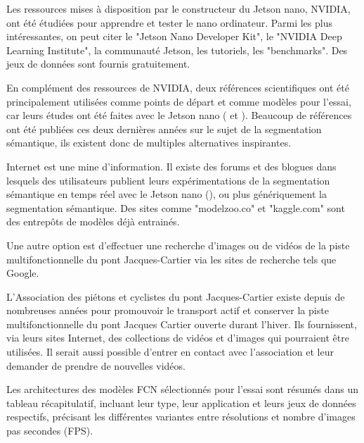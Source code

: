 ﻿\par Les ressources mises à disposition par le constructeur du Jetson nano, NVIDIA, ont été étudiées pour apprendre et tester le nano ordinateur. Parmi les plus intéressantes, on peut citer le "Jetson Nano Developer Kit", le "NVIDIA Deep Learning Institute", la communauté Jetson, les tutoriels, les "benchmarks". Des jeux de données sont fournis gratuitement.
\par En complément des ressources de NVIDIA, deux références scientifiques ont été principalement utilisées comme points de départ et comme modèles pour l'essai, car leurs études ont été faites avec le Jetson nano (\cite{nguyen_mavnet_2019} et \cite{chong_real-time_1992}). Beaucoup de références ont été publiées ces deux dernières années sur le sujet de la segmentation sémantique, ils existent donc de multiples alternatives inspirantes.
\par Internet est une mine d'information. Il existe des forums et des blogues dans lesquels des utilisateurs publient leurs expérimentations de la segmentation sémantique en temps réel avec le Jetson nano (\cite{dustin_realtime_2019}), ou plus génériquement la segmentation sémantique. Des sites comme "modelzoo.co" et "kaggle.com" sont des entrepôts de modèles déjà entrainés. 
\par Une autre option est d'effectuer une recherche d'images ou de vidéos de la piste multifonctionnelle du pont Jacques-Cartier via les sites de recherche tels que Google. 
\par L'Association des piétons et cyclistes du pont Jacques-Cartier existe depuis de nombreuses années pour promouvoir le transport actif et conserver la piste multifonctionnelle du pont Jacques Cartier ouverte durant l'hiver. Ils fournissent, via leurs sites Internet, des collections de vidéos et d'images qui pourraient être utilisées. Il serait aussi possible d'entrer en contact avec l'association et leur demander de prendre de nouvelles vidéos. \cite{association_des_pietons_et_cyclistes_du_pont_jacques-cartier_pontjacques-cartier365com_2020} \cite{association_des_pietons_et_cyclistes_pont_jacques-cartier_flickr_2020}
\par Les architectures des modèles FCN sélectionnés pour l'essai sont résumés dans un tableau récapitulatif, incluant leur type, leur application et leurs jeux de données respectifs, précisant les différentes variantes entre résolutions et nombre d'images pas secondes (FPS).
